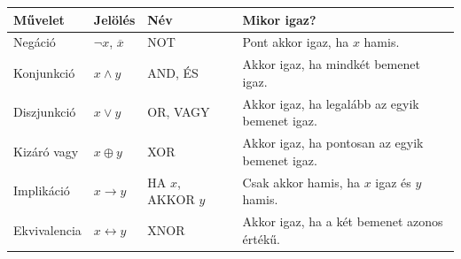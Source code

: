\begin{tabularx}{\textwidth}{L{24mm}L{24mm}L{28mm}X}
\toprule
\textbf{Művelet} & \textbf{Jelölés} & \textbf{Név} & \textbf{Mikor igaz?} \\
\midrule
Negáció & $\neg x$, $\overline{x}$ & NOT & Pont akkor igaz, ha $x$ hamis. \\
Konjunkció & $x\wedge y$ & AND, ÉS & Akkor igaz, ha mindkét bemenet igaz. \\
Diszjunkció & $x\vee y$ & OR, VAGY & Akkor igaz, ha legalább az egyik bemenet igaz. \\
Kizáró vagy & $x\oplus y$ & XOR & Akkor igaz, ha pontosan az egyik bemenet igaz. \\
Implikáció & $x\rightarrow y$ & HA $x$, AKKOR $y$ & Csak akkor hamis, ha $x$ igaz és $y$ hamis. \\
Ekvivalencia & $x\leftrightarrow y$ & XNOR & Akkor igaz, ha a két bemenet azonos értékű. \\
\bottomrule
\end{tabularx}
